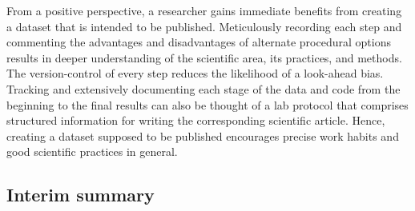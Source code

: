 %
From a positive perspective, a researcher gains immediate benefits from creating
a dataset that is intended to be published.
%
Meticulously recording each step and commenting the advantages and disadvantages
of alternate procedural options results in deeper understanding of the
scientific area, its practices, and methods.
%
The version-control of every step reduces the likelihood of a look-ahead bias.
%
Tracking and extensively documenting each stage of the data and code from the
beginning to the final results can also be thought of a lab protocol that
comprises structured information for writing the corresponding scientific
article.
%
Hence, creating a dataset supposed to be published encourages precise work
habits and good scientific practices in general.


\subsection{Interim summary}




